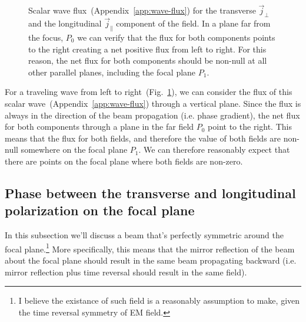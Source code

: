 \documentclass[10pt,fleqn]{article}
\begin{document}
\begin{figure}[h]
  \centering
  \caption{Scalar wave flux~(Appendix~\ref{app:wave-flux})
    for the transverse $\vec j_{\perp}$ and the longitudinal
    $\vec j_{\parallel}$ component of the field.
    In a plane far from the focus, $P_0$ we can verify that
    the flux for both components points to the right
    creating a net positive flux from left to right.
    For this reason, the net flux for both components should be non-null
    at all other parallel planes, including the focal plane $P_1$.}
  \label{fig:continuity}
\end{figure}


For a traveling wave from left to right~(Fig.~\ref{fig:continuity}),
we can consider the flux of this scalar wave~(Appendix~\ref{app:wave-flux})
through a vertical plane. Since the flux is always in the direction
of the beam propagation (i.e. phase gradient), the net flux for both components
through a plane in the far field $P_0$ point to the right.
This means that the flux for both fields, and therefore the value of both fields
are non-null somewhere on the focal plane $P_1$.
We can therefore reasonably expect that there are points on the focal plane
where both fields are non-zero.\\

\subsection{Phase between the transverse and longitudinal polarization on the focal plane}
\label{sec:semi:axial-phase}
In this subsection we'll discuss a beam that's perfectly symmetric around
the focal plane.\footnote{I believe the existance of such field
  is a reasonably assumption to make, given the time reversal symmetry of EM field.}
More specifically, this means that the mirror reflection of the beam about
the focal plane should result in the same beam propagating backward
(i.e. mirror reflection plus time reversal should result in the same field).\\
\end{document}
